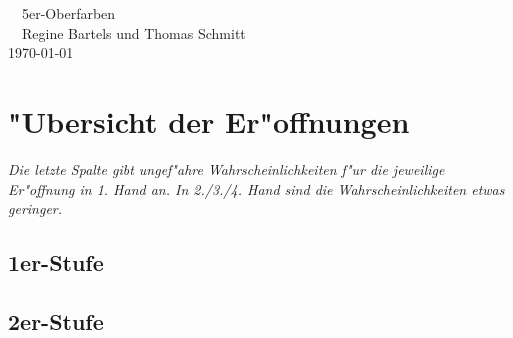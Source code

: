 \usepackage{babel}
\usepackage{fancyhdr}
\usepackage{tabularx}
\usepackage{calc}
\usepackage{suitsymbols}
\usepackage{makeidx}
\usepackage{xspace}







\begin{center}
\textsf{{\co{}~~5er-Oberfarben~~\pi\\[1ex]}
\tr{}~~Regine Bartels und Thomas Schmitt~~\ka\\[1ex]
\small \today}
\end{center}
\tableofcontents

%
%
\newpage
\section{"Ubersicht der Er"offnungen}

\emph{Die letzte Spalte gibt ungef"ahre Wahrscheinlichkeiten f"ur die jeweilige Er"offnung in 1. Hand an.  In 2./3./4. Hand sind die Wahrscheinlichkeiten etwas geringer.}

\subsection*{1er-Stufe}

\subsection*{2er-Stufe}

